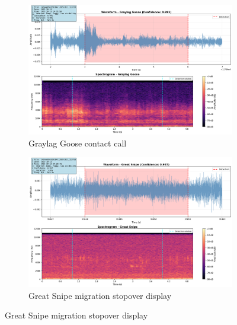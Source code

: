 \documentclass[twocolumn]{article}
\begin{document}
\begin{figure}[H]
\centering
\begin{subfigure}{0.45\textwidth}
\includegraphics[width=\textwidth]{figures/spectrogram_graylag.png}
\caption{Graylag Goose contact call}
\end{subfigure}
\hfill
\begin{subfigure}{0.45\textwidth}
\includegraphics[width=\textwidth]{figures/spectrogram_snipe.png}
\caption{Great Snipe migration stopover display}
\end{subfigure}


\end{figure}
\end{document}
